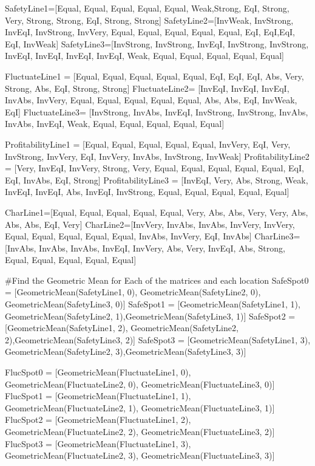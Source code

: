 \documentclass[12pt]{UIdahoMastersThesis}
\begin{document}
SafetyLine1=[Equal, Equal, Equal, Equal, Equal, Weak,Strong, EqI, Strong, Very, Strong, Strong, EqI, Strong, Strong]
SafetyLine2=[InvWeak, InvStrong, InvEqI, InvStrong, InvVery, Equal, Equal, Equal, Equal, Equal, EqI, EqI,EqI, EqI, InvWeak]
SafetyLine3=[InvStrong, InvStrong, InvEqI, InvStrong, InvStrong, InvEqI, InvEqI, InvEqI, InvEqI, Weak, Equal, Equal, Equal, Equal, Equal]

FluctuateLine1 = [Equal, Equal, Equal, Equal, Equal, EqI, EqI, EqI, Abs, Very, Strong, Abs, EqI, Strong, Strong]
FluctuateLine2= [InvEqI, InvEqI, InvEqI, InvAbs, InvVery, Equal, Equal, Equal, Equal, Equal, Abs, Abs, EqI, InvWeak, EqI]
FluctuateLine3= [InvStrong, InvAbs, InvEqI, InvStrong, InvStrong, InvAbs, InvAbs, InvEqI, Weak, Equal, Equal, Equal, Equal, Equal]

ProfitabilityLine1 = [Equal, Equal, Equal, Equal, Equal, InvVery, EqI, Very, InvStrong, InvVery, EqI, InvVery, InvAbs, InvStrong, InvWeak]
ProfitabilityLine2 = [Very, InvEqI, InvVery, Strong, Very, Equal, Equal, Equal, Equal, Equal, EqI, EqI, InvAbs, EqI, Strong]
ProfitabilityLine3 = [InvEqI, Very, Abs, Strong, Weak, InvEqI, InvEqI, Abs, InvEqI, InvStrong, Equal, Equal, Equal, Equal, Equal]

CharLine1=[Equal, Equal, Equal, Equal, Equal, Very, Abs, Abs, Very, Very, Abs, Abs, Abs, EqI, Very]
CharLine2=[InvVery, InvAbs, InvAbs, InvVery, InvVery, Equal, Equal, Equal, Equal, Equal, InvAbs, InvVery, EqI, InvAbs]
CharLine3=[InvAbs, InvAbs, InvAbs, InvEqI, InvVery, Abs, Very, InvEqI, Abs, Strong, Equal, Equal, Equal, Equal, Equal]

\#Find the Geometric Mean for Each of the matrices and each location
SafeSpot0 = [GeometricMean(SafetyLine1, 0), GeometricMean(SafetyLine2, 0), GeometricMean(SafetyLine3, 0)]
SafeSpot1 = [GeometricMean(SafetyLine1, 1), GeometricMean(SafetyLine2, 1),GeometricMean(SafetyLine3, 1)]
SafeSpot2 = [GeometricMean(SafetyLine1, 2), GeometricMean(SafetyLine2, 2),GeometricMean(SafetyLine3, 2)]
SafeSpot3 = [GeometricMean(SafetyLine1, 3), GeometricMean(SafetyLine2, 3),GeometricMean(SafetyLine3, 3)]

FlucSpot0 =  [GeometricMean(FluctuateLine1, 0), GeometricMean(FluctuateLine2, 0), GeometricMean(FluctuateLine3, 0)]
FlucSpot1  = [GeometricMean(FluctuateLine1, 1), GeometricMean(FluctuateLine2, 1), GeometricMean(FluctuateLine3, 1)]
FlucSpot2  = [GeometricMean(FluctuateLine1, 2), GeometricMean(FluctuateLine2, 2), GeometricMean(FluctuateLine3, 2)]
FlucSpot3  = [GeometricMean(FluctuateLine1, 3), GeometricMean(FluctuateLine2, 3), GeometricMean(FluctuateLine3, 3)]
\end{document}
